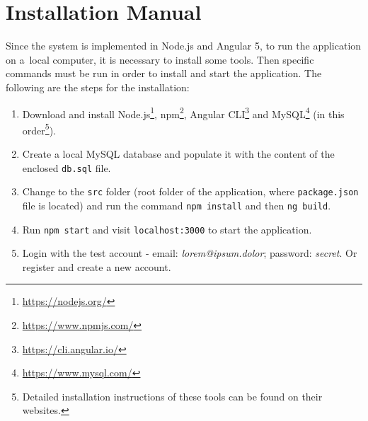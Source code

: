 \chapter{Installation Manual}
Since the system is implemented in Node.js and Angular 5, to run the application on a~local computer, it is necessary to install some tools. Then specific commands must be run in order to install and start the application. The following are the steps for the installation:

\begin{enumerate}
  \item Download and install Node.js\footnote{\url{https://nodejs.org/}}, npm\footnote{\url{https://www.npmjs.com/}}, Angular CLI\footnote{\url{https://cli.angular.io/}} and MySQL\footnote{\url{https://www.mysql.com/}} (in this order\footnote{Detailed installation instructions of these tools can be found on their websites.}).
  \item Create a local MySQL database and populate it with the content of the enclosed \texttt{db.sql} file.
  \item Change to the \texttt{src} folder (root folder of the application, where \texttt{package.json} file is located) and run the command \texttt{npm install} and then \texttt{ng build}.
  \item Run \texttt{npm start} and visit \texttt{localhost:3000} to start the application.
  \item Login with the test account - email: \textit{lorem@ipsum.dolor}; password: \textit{secret}. Or register and create a new account. 
\end{enumerate}